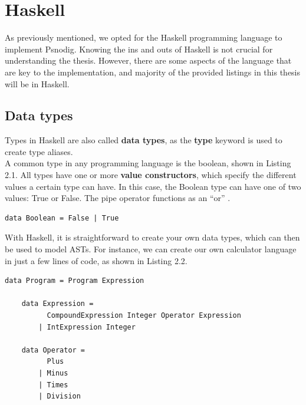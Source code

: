 \section{Haskell}

As previously mentioned, we opted for the Haskell programming language to implement Psnodig. Knowing the ins and outs of Haskell is not crucial for understanding the thesis. However, there are some aspects of the language that are key to the implementation, and majority of the provided listings in this thesis will be in Haskell.

\subsection{Data types}

Types in Haskell are also called \textbf{data types}, as the \textbf{type} keyword is used to create type aliases. \hfill \\

A common type in any programming language is the boolean, shown in Listing 2.1. All types have one or more \textbf{value constructors}, which specify the different values a certain type can have. In this case, the Boolean type can have one of two values: True or False. The pipe operator functions as an ``or'' \cite[be stian om å sjekke hvilken side dette eksemplet er på i boka]{LYAH}. \hfill \\

\begin{lstlisting}[caption={Recreating the Boolean data type with Haskell}, captionpos=b, frame=tlrb]
    data Boolean = False | True
\end{lstlisting}

With Haskell, it is straightforward to create your own data types, which can then be used to model ASTs. For instance, we can create our own calculator language in just a few lines of code, as shown in Listing 2.2. \hfill \\

\begin{lstlisting}[caption={Example data types in Haskell}, captionpos=b, frame=tlrb]
    data Program = Program Expression

    data Expression =
          CompoundExpression Integer Operator Expression
        | IntExpression Integer

    data Operator =
          Plus
        | Minus
        | Times
        | Division
\end{lstlisting}


